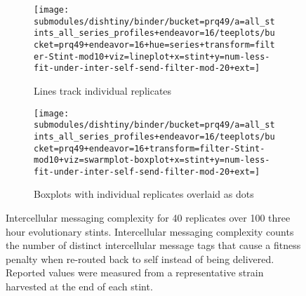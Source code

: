 \begin{figure}
\begin{center}

\begin{subfigure}[b]{\textwidth}
\centering
\texttt{[image: submodules/dishtiny/binder/bucket=prq49/a=all\_stints\_all\_series\_profiles+endeavor=16/teeplots/bucket=prq49+endeavor=16+hue=series+transform=filter-Stint-mod10+viz=lineplot+x=stint+y=num-less-fit-under-inter-self-send-filter-mod-20+ext=]}%
\caption{
Lines track individual replicates
}
\label{fig:inter-messaging-complexity-vs-stint-lineplot}
\end{subfigure}

\begin{subfigure}[b]{\columnwidth}
\centering
\texttt{[image: submodules/dishtiny/binder/bucket=prq49/a=all\_stints\_all\_series\_profiles+endeavor=16/teeplots/bucket=prq49+endeavor=16+transform=filter-Stint-mod10+viz=swarmplot-boxplot+x=stint+y=num-less-fit-under-inter-self-send-filter-mod-20+ext=]}
\caption{
Boxplots with individual replicates overlaid as dots
}
\label{fig:inter-messaging-complexity-vs-stint-boxplot}
\end{subfigure}

\caption{
Intercellular messaging complexity for 40 replicates over 100 three hour evolutionary stints.
Intercellular messaging complexity counts the number of distinct intercellular message tags that cause a fitness penalty when re-routed back to self instead of being delivered.
Reported values were measured from a representative strain harvested at the end of each stint.
}
\label{fig:inter-messaging-complexity-vs-stint}

\end{center}
\end{figure}
